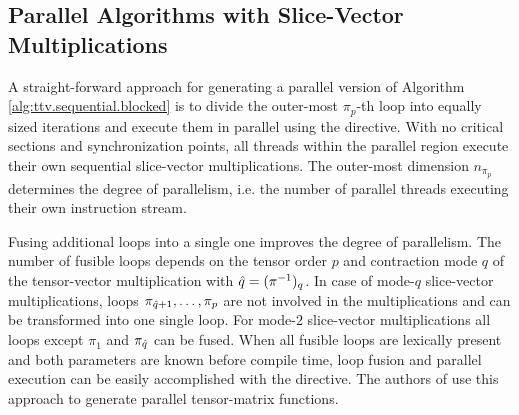 

\subsection{Parallel Algorithms with Slice-Vector Multiplications}
\label{subsec:parallel.multi-loops}
A straight-forward approach for generating a parallel version of Algorithm \ref{alg:ttv.sequential.blocked} is to divide the outer-most $\pi_p$-th loop into equally sized iterations and execute them in parallel using the    directive\cite{bassoy:2018:fast}.
With no critical sections and synchronization points, all threads within the parallel region execute their own sequential slice-vector multiplications.
The outer-most dimension $n_{\pi_p}$ determines the degree of parallelism, i.e. the number of parallel threads executing their own instruction stream.


Fusing additional loops into a single one improves the degree of parallelism.
The number of fusible loops depends on the tensor order $p$ and contraction mode $q$ of the tensor-vector multiplication with $\hat{q} = (\pi^{-1})_q$.
In case of mode-$q$ slice-vector multiplications, loops $\pi_{\hat{q}+1}, \dots, \pi_{p}$ are not involved in the multiplications and can be transformed into one single loop.
For mode-$2$ slice-vector multiplications all loops except $\pi_1$ and $\pi_{\hat{q}}$ can be fused.
When all fusible loops are lexically present and both parameters are known before compile time, loop fusion and parallel execution can be easily accomplished with the   directive.
The authors of \cite{li:2015:input} use this approach to generate parallel tensor-matrix functions.

